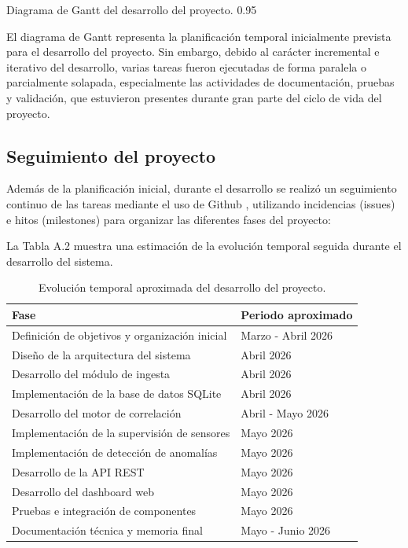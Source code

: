  {Diagrama de Gantt del desarrollo del proyecto.}
 {0.95}
 
El diagrama de Gantt representa la planificación temporal inicialmente prevista para el desarrollo del proyecto. Sin embargo, debido al carácter incremental e iterativo del desarrollo, varias tareas fueron ejecutadas de forma paralela o parcialmente solapada, especialmente las actividades de documentación, pruebas y validación, que estuvieron presentes durante gran parte del ciclo de vida del proyecto.

\subsection{Seguimiento del proyecto}

Además de la planificación inicial, durante el desarrollo se realizó un seguimiento continuo de las tareas mediante el uso de Github \cite{github}, utilizando incidencias (issues) e hitos (milestones) para organizar las diferentes fases del proyecto:

La Tabla A.2 muestra una estimación de la evolución temporal seguida durante el desarrollo del sistema.

\begin{table}[htbp]
	\centering
	\begin{tabular}{|l|l|}
		\hline
		\textbf{Fase} & \textbf{Periodo aproximado} \\
		\hline
		Definición de objetivos y organización inicial & Marzo - Abril 2026 \\
		Diseño de la arquitectura del sistema & Abril 2026 \\
		Desarrollo del módulo de ingesta & Abril 2026 \\
		Implementación de la base de datos SQLite & Abril 2026 \\
		Desarrollo del motor de correlación & Abril - Mayo 2026 \\
		Implementación de la supervisión de sensores & Mayo 2026 \\
		Implementación de detección de anomalías & Mayo 2026 \\
		Desarrollo de la API REST & Mayo 2026 \\
		Desarrollo del dashboard web & Mayo 2026 \\
		Pruebas e integración de componentes & Mayo 2026 \\
		Documentación técnica y memoria final & Mayo - Junio 2026 \\
		\hline
	\end{tabular}
	\caption{Evolución temporal aproximada del desarrollo del proyecto.}
\end{table}

